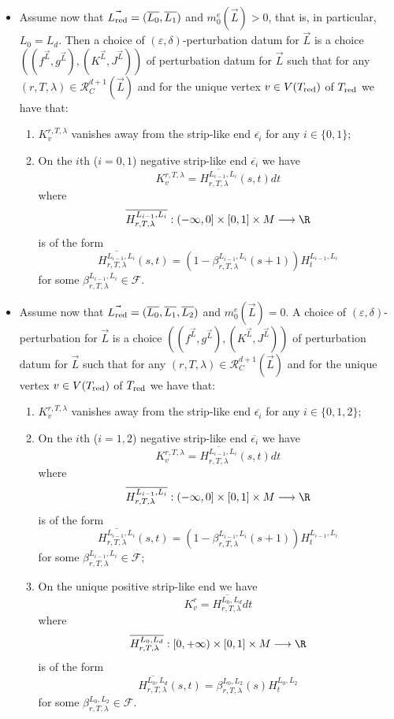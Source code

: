 \begin{itemize}
		\item[\textbf{Case 3}]\label{case3} Assume now that $\vec{L_\textnormal{red}}=(\overline{L_0},\overline{L_1})$ and $m_0^e(\vec{L})>0$, that is, in particular, $L_0=L_d$. Then a choice of $(\varepsilon,\delta)$-perturbation datum for $\vec{L}$ is a choice $\left((f^{\vec{L}},g^{\vec{L}}),(K^{\vec{L}},J^{\vec{L}})\right)$ of perturbation datum for $\vec{L}$ such that for any $(r,T,\lambda)\in \mathcal{R}^{d+1}_C(\vec{L})$ and for the unique vertex $v\in V(T_\textnormal{red})$ of $T_\textnormal{red}$ we have that: \begin{enumerate}
			\item $K^{r,T,\lambda}_v$ vanishes away from the strip-like end $\overline{\epsilon_i}$ for any $i\in \{0,1\}$;
			\item On the $i$th ($i=0,1$) negative strip-like end $\overline{\epsilon_i}$ we have $$K^{r,T,\lambda}_v=\overline{H^{L_{i-1},L_i}_{r,T,\lambda}}(s,t)dt$$ where $$\overline{H^{L_{i-1},L_i}_{r,T,\lambda}}: (-\infty,0]\times [0,1]\times M \longrightarrow \R$$ is of the form $$\overline{H^{L_{i-1},L_i}_{r,T,\lambda}}(s,t)= (1-\beta^{L_{i-1},L_i}_{r,T,\lambda}(s+1))H^{L_{i-1},L_i}_t$$ for some $\beta^{L_{i-1},L_i}_{r,T,\lambda}\in \mathcal{F}$.
		\end{enumerate}
		\item[\textbf{Case 4}] Assume now that $\vec{L_\textnormal{red}}=(\overline{L_0},\overline{L_1}, \overline{L_2})$ and $m_0^e(\vec{L})=0$. A choice of $(\varepsilon,\delta)$-perturbation for $\vec{L}$ is a choice $\left((f^{\vec{L}},g^{\vec{L}}),(K^{\vec{L}},J^{\vec{L}})\right)$ of perturbation datum for $\vec{L}$ such that for any $(r,T,\lambda)\in \mathcal{R}^{d+1}_C(\vec{L})$ and for the unique vertex $v\in V(T_\textnormal{red})$ of $T_\textnormal{red}$ we have that: \begin{enumerate}
			\item $K^{r,T,\lambda}_v$ vanishes away from the strip-like end $\overline{\epsilon_i}$ for any $i\in \{0,1,2\}$;
			\item On the $i$th ($i=1,2$) negative strip-like end $\overline{\epsilon_i}$ we have $$K^{r,T,\lambda}_v=\overline{H^{L_{i-1},L_i}_{r,T,\lambda}}(s,t)dt$$ where $$\overline{H^{L_{i-1},L_i}_{r,T,\lambda}}: (-\infty,0]\times [0,1]\times M \longrightarrow \R$$ is of the form $$\overline{H^{L_{i-1},L_i}_{r,T,\lambda}}(s,t)= (1-\beta^{L_{i-1},L_i}_{r,T,\lambda}(s+1))H^{L_{i-1},L_i}_t$$ for some $\beta^{L_{i-1},L_i}_{r,T,\lambda}\in \mathcal{F}$;
			\item On the unique positive strip-like end we have $$K^{r}_v=\overline{H^{L_{0},L_d}_{r,T,\lambda}}dt$$ where $$\overline{H^{L_{0},L_d}_{r,T,\lambda}}: [0,+\infty)\times [0,1]\times M \longrightarrow \R$$ is of the form $$\overline{H^{L_0,L_d}_{r,T,\lambda}}(s,t)= \beta^{L_0,L_2}_{r,T,\lambda}(s)H^{L_0,L_2}_t$$ for some $\beta^{L_0,L_2}_{r,T,\lambda}\in \mathcal{F}$.

\end{enumerate}
\end{itemize}
